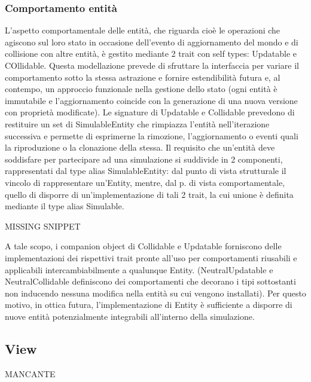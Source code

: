 \subsubsection{Comportamento entità}
L’aspetto comportamentale delle entità, che riguarda cioè le operazioni che agiscono sul loro stato in occasione dell’evento di aggiornamento del mondo e di collisione con altre entità, è gestito mediante 2 trait con self types: Updatable e COllidable. Questa modellazione prevede di sfruttare la interfaccia per variare il comportamento sotto la stessa astrazione e fornire estendibilità futura e, al contempo, un approccio funzionale nella gestione dello stato (ogni entità è immutabile e l’aggiornamento coincide con la generazione di una nuova versione con proprietà modificate). Le signature di Updatable e Collidable prevedono di restituire un set di SimulableEntity che rimpiazza l’entità nell’iterazione successiva e permette di esprimerne la rimozione, l’aggiornamento o eventi quali la riproduzione o la clonazione della stessa.
Il requisito che un’entità deve soddisfare per partecipare ad una simulazione si suddivide in 2 componenti, rappresentati dal type alias SimulableEntity: dal punto di vista strutturale il vincolo di rappresentare un’Entity, mentre, dal p. di vista comportamentale, quello di disporre di un’implementazione di tali 2 trait, la cui unione è definita mediante il type alias Simulable. 

MISSING SNIPPET

A tale scopo, i companion object di Collidable e Updatable forniscono delle implementazioni dei rispettivi trait pronte all’uso per comportamenti riusabili e applicabili intercambiabilmente a qualunque Entity. (NeutralUpdatable e NeutralCollidable definiscono dei comportamenti che decorano i tipi sottostanti non inducendo nessuna modifica nella entità su cui vengono installati). Per questo motivo, in ottica futura, l’implementazione di Entity è sufficiente a disporre di nuove entità potenzialmente integrabili all’interno della simulazione.


\subsection{View}

MANCANTE

